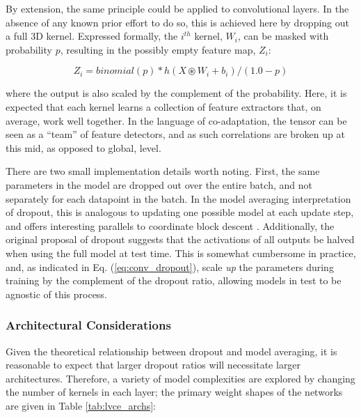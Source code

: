 By extension, the same principle could be applied to convolutional layers.
In the absence of any known prior effort to do so, this is achieved here by dropping out a full 3D kernel.
Expressed formally, the $i^{th}$ kernel, $W_i$, can be masked with probability $p$, resulting in the possibly empty feature map, $Z_i$:

\begin{equation}
\label{eq:conv_dropout}
Z_i = binomial(p) * h(X \circledast W_i + b_i) / (1.0 - p)
\end{equation}

\noindent where the output is also scaled by the complement of the probability.
Here, it is expected that each kernel learns a collection of feature extractors that, on average, work well together.
In the language of co-adaptation, the tensor can be seen as a ``team'' of feature detectors, and as such correlations are broken up at this mid, as opposed to global, level.

There are two small implementation details worth noting.
First, the same parameters in the model are dropped out over the entire batch, and not separately for each datapoint in the batch.
In the model averaging interpretation of dropout, this is analogous to updating one possible model at each update step, and offers interesting parallels to coordinate block descent \cite{somebody}.
Additionally, the original proposal of dropout suggests that the activations of all outputs be halved when using the full model at test time.
This is somewhat cumbersome in practice, and, as indicated in Eq. (\ref{eq:conv_dropout}), scale \emph{up} the parameters during training by the complement of the dropout ratio, allowing models in test to be agnostic of this process.


\subsubsection{Architectural Considerations}
\label{subsubsec:arch}

Given the theoretical relationship between dropout and model averaging, it is reasonable to expect that larger dropout ratios will necessitate larger architectures.
Therefore, a variety of model complexities are explored by changing the number of kernels in each layer; the primary weight shapes of the networks are given in Table \ref{tab:lvce_archs}:

